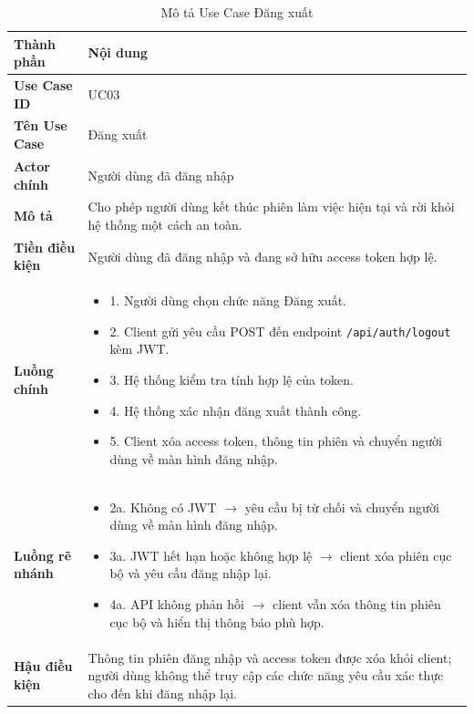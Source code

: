 \begin{longtable}{|L{3cm}|L{11cm}|}

\caption{Mô tả Use Case Đăng xuất}
\label{tab:mo-ta-uc03-dang-xuat}
\\
\hline

\textbf{Thành phần} & \textbf{Nội dung} \\
\hline

\textbf{Use Case ID} & UC03 \\
\hline

\textbf{Tên Use Case} & Đăng xuất \\
\hline

\textbf{Actor chính} & Người dùng đã đăng nhập \\
\hline

\textbf{Mô tả} &
Cho phép người dùng kết thúc phiên làm việc hiện tại và rời khỏi hệ thống một cách an toàn.
\\
\hline

\textbf{Tiền điều kiện} &
Người dùng đã đăng nhập và đang sở hữu access token hợp lệ.
\\
\hline

\textbf{Luồng chính} &
\begin{itemize}[leftmargin=*,topsep=2pt,itemsep=2pt]
    \item 1. Người dùng chọn chức năng Đăng xuất.
    \item 2. Client gửi yêu cầu POST đến endpoint \texttt{/api/auth/logout} kèm JWT.
    \item 3. Hệ thống kiểm tra tính hợp lệ của token.
    \item 4. Hệ thống xác nhận đăng xuất thành công.
    \item 5. Client xóa access token, thông tin phiên và chuyển người dùng về màn hình đăng nhập.
\end{itemize}
\\
\hline

\textbf{Luồng rẽ nhánh} &
\begin{itemize}[leftmargin=*,topsep=2pt,itemsep=2pt]
    \item 2a. Không có JWT $\rightarrow$ yêu cầu bị từ chối và chuyển người dùng về màn hình đăng nhập.
    \item 3a. JWT hết hạn hoặc không hợp lệ $\rightarrow$ client xóa phiên cục bộ và yêu cầu đăng nhập lại.
    \item 4a. API không phản hồi $\rightarrow$ client vẫn xóa thông tin phiên cục bộ và hiển thị thông báo phù hợp.
\end{itemize}
\\
\hline

\textbf{Hậu điều kiện} &
Thông tin phiên đăng nhập và access token được xóa khỏi client; người dùng không thể truy cập các chức năng yêu cầu xác thực cho đến khi đăng nhập lại.
\\
\hline

\end{longtable}

